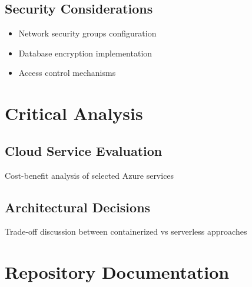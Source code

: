 \documentclass{llncs}
\begin{document}
\subsection{Security Considerations}
\begin{itemize}
    \item Network security groups configuration
    \item Database encryption implementation
    \item Access control mechanisms
\end{itemize}

\section{Critical Analysis}
\subsection{Cloud Service Evaluation}
Cost-benefit analysis of selected Azure services

\subsection{Architectural Decisions}
Trade-off discussion between containerized vs serverless approaches

\section{Repository Documentation}
\end{document}
